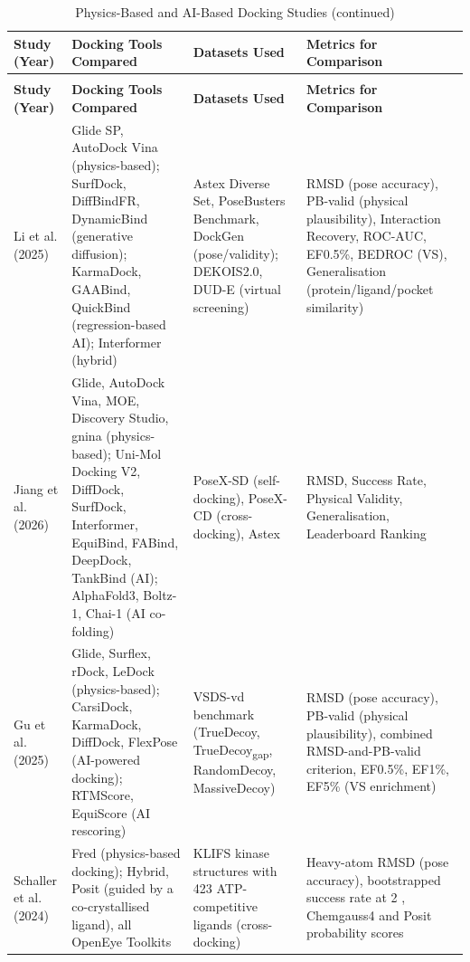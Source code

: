 \begin{longtable}[]{@{}
  >{\raggedright\arraybackslash}p{}
  >{\raggedright\arraybackslash}p{}
  >{\raggedright\arraybackslash}p{}
  >{\raggedright\arraybackslash}p{}@{}}
\caption{Physics-Based and AI-Based Docking Studies}\label{tab:literature-comparisons}\tabularnewline
\toprule\noalign{}
{\raggedright \textbf{Study (Year)}} & \centering\arraybackslash\textbf{Docking Tools Compared} & \centering\arraybackslash\textbf{Datasets Used} & \centering\arraybackslash\textbf{Metrics for Comparison} \\
\midrule\noalign{}
\endfirsthead
\caption[]{Physics-Based and AI-Based Docking Studies (continued)}\tabularnewline

\toprule\noalign{}
{\raggedright \textbf{Study (Year)}} & \centering\arraybackslash\textbf{Docking Tools Compared} & \centering\arraybackslash\textbf{Datasets Used} & \centering\arraybackslash\textbf{Metrics for Comparison} \\
\midrule\noalign{}
\endhead
\bottomrule\noalign{}
\endlastfoot
Li et al. (2025) \cite{ref013} & Glide SP, AutoDock Vina (physics-based); SurfDock, DiffBindFR, DynamicBind (generative diffusion); KarmaDock, GAABind, QuickBind (regression-based AI); Interformer (hybrid) & Astex Diverse Set, PoseBusters Benchmark, DockGen (pose/validity); DEKOIS2.0, DUD-E (virtual screening) & RMSD (pose accuracy), PB-valid (physical plausibility), Interaction Recovery, ROC-AUC, EF0.5\%, BEDROC (VS), Generalisation (protein/ligand/pocket similarity) \\
Jiang et al. (2026) \cite{ref012} & Glide, AutoDock Vina, MOE, Discovery Studio, gnina (physics-based); Uni-Mol Docking V2, DiffDock, SurfDock, Interformer, EquiBind, FABind, DeepDock, TankBind (AI); AlphaFold3, Boltz-1, Chai-1 (AI co-folding) & PoseX-SD (self-docking), PoseX-CD (cross-docking), Astex & RMSD, Success Rate, Physical Validity, Generalisation, Leaderboard Ranking \\
Gu et al. (2025) \cite{ref032} & Glide, Surflex, rDock, LeDock (physics-based); CarsiDock, KarmaDock, DiffDock, FlexPose (AI-powered docking); RTMScore, EquiScore (AI rescoring) & VSDS-vd benchmark (TrueDecoy, TrueDecoy\textsubscript{gap}, RandomDecoy, MassiveDecoy) & RMSD (pose accuracy), PB-valid (physical plausibility), combined RMSD-and-PB-valid criterion, EF0.5\%, EF1\%, EF5\% (VS enrichment) \\
Schaller et al. (2024) \cite{ref033} & Fred (physics-based docking); Hybrid, Posit (guided by a co-crystallised ligand), all OpenEye Toolkits & 589 KLIFS kinase structures with 423 ATP-competitive ligands (cross-docking) & Heavy-atom RMSD (pose accuracy), bootstrapped success rate at 2 \angstrom{}, Chemgauss4 and Posit probability scores \\
\end{longtable}

